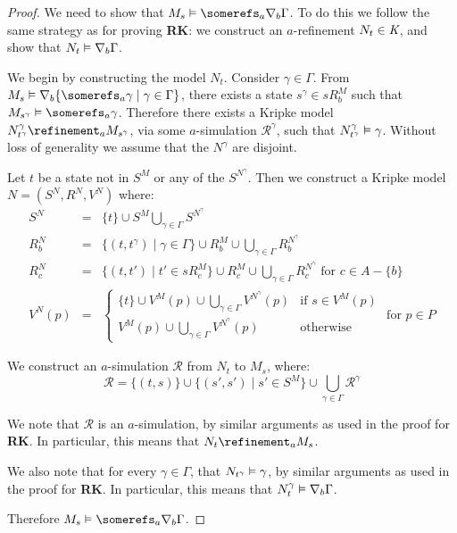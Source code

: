 \begin{proof}
We need to show that $M_s \entails \somerefs_a \covers_b \Gamma$. To do this we
follow the same strategy as for proving {\bf RK}: we construct an $a$-refinement
$N_t \in \textit{K}$, and show that $N_t \vDash \nabla_b \Gamma$.

We begin by constructing the model $N_t$. Consider $\gamma \in \Gamma$. From
$M_s \entails \covers_b \{ \somerefs_a \gamma \mid \gamma \in \Gamma \}$, there
exists a state $s^\gamma \in sR^M_b$ such that $M_{s^\gamma} \entails
\somerefs_a \gamma$. Therefore there exists a Kripke model $N^\gamma_{t^\gamma}
\refinement_a M_{s^\gamma}$, via some $a$-simulation $\mathcal{R}^\gamma$, such
that $N^\gamma_{t^\gamma} \vDash \gamma$. Without loss of generality we assume
that the $N^\gamma$ are disjoint.

Let $t$ be a state not in $S^M$ or any of the $S^{N^\gamma}$. Then we construct a
Kripke model $N = (S^N, R^N, V^N)$ where:
\begin{eqnarray*}
S^N &=& \{t\} \cup S^M \bigcup_{\gamma \in \Gamma} S^{N^\gamma}\\
R^N_b &=& \{(t, t^\gamma) \mid \gamma \in \Gamma\} 
\cup  R^M_b 
\cup \bigcup_{\gamma \in \Gamma} R^{N^\gamma}_b\\
R^N_c &=& \{(t, t') \mid t' \in sR^M_c\} 
\cup R^M_c \cup \bigcup_{\gamma \in \Gamma} R^{N^\gamma}_c \text{ for $c \in A - \{b\}$}\\
V^N(p) &=& 
\begin{cases}
\displaystyle \{t\} \cup V^M(p) \cup \bigcup_{\gamma \in \Gamma} V^{N^\gamma}(p)
& \text{if $s \in V^M(p)$}\\
\displaystyle V^M(p) \cup \bigcup_{\gamma \in \Gamma} V^{N^\gamma}(p) &
\text{otherwise}
\end{cases}
\text{ for $p \in P$}
\end{eqnarray*}

We construct an $a$-simulation $\mathcal{R}$ from $N_t$ to $M_s$, where:
$$\mathcal{R} = \{(t, s)\} \cup \{(s', s') \mid s' \in S^M\} \cup
\bigcup_{\gamma \in \Gamma} \mathcal{R}^\gamma$$

We note that $\mathcal{R}$ is an $a$-simulation, by similar arguments as used in
the proof for {\bf RK}. In particular, this means that $N_t \refinement_a M_s$.

We also note that for every $\gamma \in \Gamma$, that $N_{t^\gamma} \vDash
\gamma$, by similar arguments as used in the proof for {\bf RK}. In particular,
this means that $N^\gamma_t \vDash \nabla_b \Gamma$.

Therefore $M_s \entails \somerefs_a \covers_b \Gamma$.


\end{proof}
